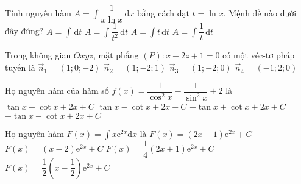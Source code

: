 \begin{ex}%
Tính nguyên hàm $A=\displaystyle\int\limits \dfrac{1}{x\ln{x}}\mathrm{\,d}x$ bằng cách đặt $t=\ln{x}$. Mệnh đề nào dưới đây đúng?
\choice
{$A=\displaystyle\int\limits \mathrm{\,d}t$}
{$A=\displaystyle\int\limits \dfrac{1}{t^2} \mathrm{\,d}t$}
{$A=\displaystyle\int\limits t \mathrm{\,d}t$}
{\True $A=\displaystyle\int\limits \dfrac{1}{t} \mathrm{\,d}t$}
\end{ex}

\begin{ex}%
Trong không gian $O x y z$, mặt phẳng $(P): x-2 z+1=0$ có một véc-tơ pháp tuyến là
\choice
{\True $\vec{n}_{1}=(1 ; 0 ;-2)$}
{$\vec{n}_{2}=(1 ;-2 ; 1)$}
{$\vec{n}_{3}=(1 ;-2 ; 0)$}
{$\vec{n}_{4}=(-1 ; 2 ; 0)$}
\end{ex}

\begin{ex}%
Họ nguyên hàm của hàm số $f(x)=\dfrac{1}{\cos^2 x}-\dfrac{1}{\sin^2 x}+2$ là
\choice
{\True $\tan x+\cot x+2x+C$}
{$\tan x-\cot x+2x+C$}
{$-\tan x+\cot x+2x+C$}
{$-\tan x-\cot x+2x+C$}
\end{ex}

\begin{ex}%
Họ nguyên hàm $F(x)=\displaystyle\int x\mathrm{e}^{2x}\mathrm{d}x$ là
\choice
{$F(x)=(2x-1)\mathrm{e}^{2x}+C$}
{$F(x)=(x-2)\mathrm{e}^{2x}+C$}
{$F(x)=\dfrac{1}{4}(2x+1)\mathrm{e}^{2x}+C$}
{\True $F(x)=\dfrac{1}{2}\left(x-\dfrac{1}{2}\right)\mathrm{e}^{2x}+C$}
\end{ex}


